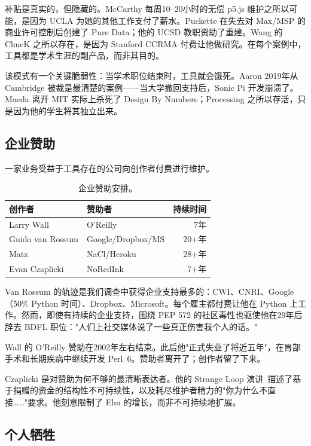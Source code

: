 \documentclass[10pt,letterpaper,twocolumn]{article}
\begin{document}
补贴是真实的，但隐藏的。McCarthy 每周10--20小时的无偿 p5.js 维护之所以可能，是因为 UCLA 为她的其他工作支付了薪水。Puckette 在失去对 Max/MSP 的商业许可控制后创建了 Pure Data；他的 UCSD 教职资助了重建。Wang 的 ChucK 之所以存在，是因为 Stanford CCRMA 付费让他做研究。在每个案例中，工具都是学术生涯的副产品，而非其目的。

该模式有一个关键脆弱性：当学术职位结束时，工具就会饿死。Aaron 2019年从 Cambridge 被裁是最清楚的案例——当大学撤回支持后，Sonic Pi 开发崩溃了。Maeda 离开 MIT 实际上杀死了 Design By Numbers；Processing 之所以存活，只是因为他的学生将其独立出来。

\subsection{企业赞助}

一家业务受益于工具存在的公司向创作者付费进行维护。

\begin{table}[h]
\small
\centering
\begin{tabularx}{\columnwidth}{Xlr}
\toprule
\textbf{创作者} & \textbf{赞助者} & \textbf{持续时间} \\
\midrule
Larry Wall & O'Reilly & 7年 \\
Guido van Rossum & Google/Dropbox/MS & 20+年 \\
Matz & NaCl/Heroku & 28+年 \\
Evan Czaplicki & NoRedInk & 7+年 \\
\bottomrule
\end{tabularx}
\caption{企业赞助安排。}
\label{tab:corporate}
\end{table}

Van Rossum 的轨迹是我们调查中获得企业支持最多的：CWI、CNRI、Google（50\% Python 时间）、Dropbox、Microsoft。每个雇主都付费让他在 Python 上工作。然而，即使有持续的企业支持，围绕 PEP 572 的社区毒性也驱使他在29年后辞去 BDFL 职位："人们上社交媒体说了一些真正伤害我个人的话。"

Wall 的 O'Reilly 赞助在2002年左右结束。此后他"正式失业了将近五年"，在胃部手术和长期疾病中继续开发 Perl~6。赞助者离开了；创作者留了下来。

Czaplicki 是对赞助为何不够的最清晰表达者。他的 Strange Loop 演讲~\citep{czaplicki2018hard, czaplicki2023economics}描述了基于捐赠的资金的结构性不可持续性，以及耗尽维护者精力的"你为什么不直接……"要求。他刻意限制了 Elm 的增长，而非不可持续地扩展。

\subsection{个人牺牲}
\end{document}
